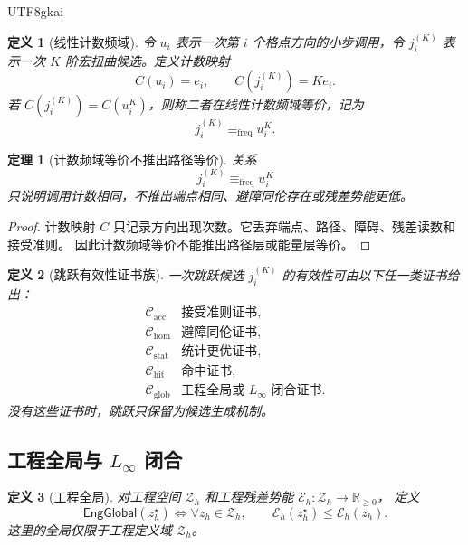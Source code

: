 \documentclass[12pt]{article}
\newtheorem{definition}{定义}[section]
\newtheorem{theorem}{定理}[section]
\newcommand{\RR}{\mathbb{R}}
\newcommand{\EngGlobal}{\ensuremath{\mathsf{EngGlobal}}}
\newcommand{\Linfty}{\ensuremath{L_\infty}}
\begin{document}
\begin{CJK*}{UTF8}{gkai}
\begin{definition}[线性计数频域]
令 \(u_i\) 表示一次第 \(i\) 个格点方向的小步调用，令 \(j_i^{(K)}\) 表示一次
\(K\) 阶宏扭曲候选。定义计数映射
\[
  C(u_i)=e_i,
  \qquad
  C(j_i^{(K)})=K e_i .
\]
若 \(C(j_i^{(K)})=C(u_i^K)\)，则称二者在线性计数频域等价，记为
\[
  j_i^{(K)}\equiv_{\mathrm{freq}}u_i^K .
\]
\end{definition}

\begin{theorem}[计数频域等价不推出路径等价]
\label{thm:lhts-count-not-path}
关系
\[
  j_i^{(K)}\equiv_{\mathrm{freq}}u_i^K
\]
只说明调用计数相同，不推出端点相同、避障同伦存在或残差势能更低。
\end{theorem}

\begin{proof}
计数映射 \(C\) 只记录方向出现次数。它丢弃端点、路径、障碍、残差读数和接受准则。
因此计数频域等价不能推出路径层或能量层等价。
\end{proof}

\begin{definition}[跳跃有效性证书族]
一次跳跃候选 \(j_i^{(K)}\) 的有效性可由以下任一类证书给出：
\[
\begin{array}{ll}
\mathcal C_{\mathrm{acc}} & \text{接受准则证书},\\
\mathcal C_{\mathrm{hom}} & \text{避障同伦证书},\\
\mathcal C_{\mathrm{stat}} & \text{统计更优证书},\\
\mathcal C_{\mathrm{hit}} & \text{命中证书},\\
\mathcal C_{\mathrm{glob}} & \text{工程全局或 }\Linfty\text{ 闭合证书}.
\end{array}
\]
没有这些证书时，跳跃只保留为候选生成机制。
\end{definition}

\subsection{工程全局与 \texorpdfstring{\(L_\infty\)}{L-infinity} 闭合}
\label{subsec:lhts-global-closure}

\begin{definition}[工程全局]
对工程空间 \(\mathcal Z_h\) 和工程残差势能 \(\mathcal E_h:\mathcal Z_h\to\RR_{\ge0}\)，
定义
\[
  \EngGlobal(z_h^\star)
  \Longleftrightarrow
  \forall z_h\in\mathcal Z_h,
  \qquad
  \mathcal E_h(z_h^\star)\le\mathcal E_h(z_h).
\]
这里的全局仅限于工程定义域 \(\mathcal Z_h\)。
\end{definition}


\end{CJK*}
\end{document}

